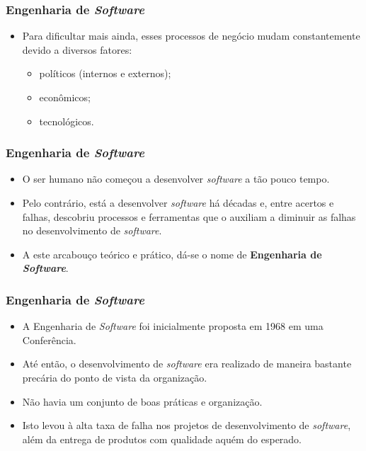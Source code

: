 \documentclass[11pt]{beamer}
\begin{document}
    \begin{frame}
      \frametitle{Engenharia de \textit{Software}}
      \begin{itemize}
        \item Para dificultar mais ainda, esses processos de negócio mudam constantemente devido a diversos fatores:
        \begin{itemize}
          \item políticos (internos e externos);
          \item econômicos;
          \item tecnológicos.
        \end{itemize}
      \end{itemize}
    \end{frame}
    
   \begin{frame}
      \frametitle{Engenharia de \textit{Software}}
      \begin{itemize}
        \item O ser humano não começou a desenvolver \textit{software} a tão pouco tempo.
        \item Pelo contrário, está a desenvolver \textit{software} há décadas e, entre acertos e falhas, descobriu processos e ferramentas que o auxiliam a diminuir as falhas no desenvolvimento de \textit{software}.
        \item A este arcabouço teórico e prático, dá-se o nome de \textbf{Engenharia de \textit{Software}}.
      \end{itemize}
   \end{frame}
        
   \begin{frame}
      \frametitle{Engenharia de \textit{Software}}
      \begin{itemize}
        \item A Engenharia de \textit{Software} foi inicialmente proposta em 1968 em uma Conferência.
        \item Até então, o desenvolvimento de \textit{software} era realizado de maneira bastante precária do ponto de vista da organização.
        \item Não havia um conjunto de boas práticas e organização.
        \item Isto levou à alta taxa de falha nos projetos de desenvolvimento de \textit{software}, além da entrega de produtos com qualidade aquém do esperado.
      \end{itemize}
   \end{frame}   
   
\end{document}
